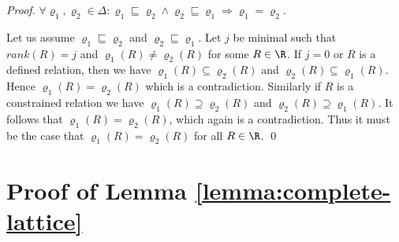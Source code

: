 \begin{proof}
 $\forall \varrho_1, \varrho_2 \in \Delta: \varrho_1
\sqsubseteq \varrho_2 \wedge \varrho_2 \sqsubseteq \varrho_1
\Rightarrow \varrho_1 = \varrho_2$.

\noindent Let us assume $\varrho_1 \sqsubseteq \varrho_2$ and
$\varrho_2 \sqsubseteq \varrho_1$. Let $j$ be minimal such that
$rank(R)=j$ and $\varrho_1(R) \neq \varrho_2(R)$ for some $R \in
\R$. If $j=0$ or $R$ is a defined relation, then we have $\varrho_1(R)
\subseteq \varrho_2(R)$ and $\varrho_2(R) \subseteq \varrho_1(R)$.
Hence $\varrho_1(R) = \varrho_2(R)$ which is a
contradiction. Similarly if $R$ is a constrained relation we have
$\varrho_1(R) \supseteq \varrho_2(R)$ and $\varrho_2(R) \supseteq
\varrho_1(R)$. It follows that $\varrho_1(R) = \varrho_2(R)$, which
again is a contradiction. Thus it must be the case that $\varrho_1(R)
= \varrho_2(R)$ for all $R \in \R$.
\qed
\end{proof}

\section{Proof of Lemma \ref{lemma:complete-lattice}}\label{proof:lemma:complete-lattice}

